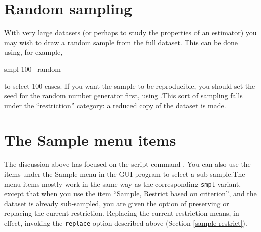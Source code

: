 \section{Random sampling}
\label{sample-random}

With very large datasets (or perhaps to study the properties of an
estimator) you may wish to draw a random sample from the full dataset.
This can be done using, for example,
%
\begin{code}
	smpl 100 --random
\end{code}
%
to select 100 cases.  If you want the sample to be reproducible, you
should set the seed for the random number generator first, using
.This sort of sampling falls under the ``restriction''
category: a reduced copy of the dataset is made.

\section{The Sample menu items}
\label{sample-menu}

The discussion above has focused on the script command . You
can also use the items under the \textsf{Sample} menu in the GUI
program to select a sub-sample.The menu items mostly work in the same
way as the corresponding \verb+smpl+ variant, except that when you use
the item ``Sample, Restrict based on criterion'', and the dataset is
already sub-sampled, you are given the option of preserving or
replacing the current restriction.  Replacing the current restriction
means, in effect, invoking the \verb+replace+ option described above
(Section \ref{sample-restrict}).
    


